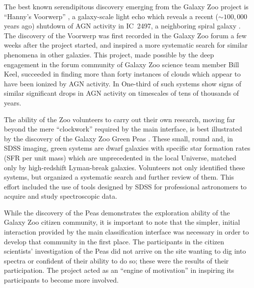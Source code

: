 \documentclass{ar2e}
\def\CaseStudy#1{\noindent{\it\bf #1 \,\,\,\,}}
\begin{document}


\CaseStudy{The Galaxy Zoo Forum.} 

The best known serendipitous discovery emerging from the Galaxy Zoo project is
``Hanny's Voorwerp'' \citep{Lintott++2009}, a galaxy-scale light echo which
reveals a recent ($\sim100,000$ years ago)  shutdown of AGN activity in IC~2497, 
a neighboring spiral galaxy \citep{Keel++2012}. 
The discovery of the Voorwerp was first
recorded in the Galaxy Zoo forum a few weeks after the project started, and
inspired a more systematic search for similar phenomena in other galaxies. This
project, made possible by the deep engagement in the forum community of Galaxy
Zoo science team member Bill Keel, succeeded in finding more than forty
instances of clouds which appear to have been ionized by AGN activity. In
One-third of such systems show signs of similar significant drops in AGN activity on
timescales of tens of thousands of years.  

The ability of the Zoo volunteers to carry out their own research, moving far
beyond the mere ``clockwork'' required by the main interface, is best
illustrated by the discovery of the Galaxy Zoo Green Peas
\citep{Cardamone++2009}. These small, round and, in SDSS imaging, green systems
are dwarf galaxies with specific star formation rates (SFR per unit mass) which
are unprecedented in the local Universe, matched only by high-redshift
Lyman-break galaxies. Volunteers not only identified these systems, but
organized a systematic search and further review of them. This effort included
the use of tools designed by SDSS for professional astronomers to acquire and
study spectroscopic data. 

While the discovery of the Peas demonstrates the exploration ability of the
Galaxy Zoo citizen community, it is important to note that the simpler, initial
interaction provided by the main classification interface was necessary in order
to develop that community in the first place. The participants in the citizen
scientists' investigation of the Peas did not arrive on the site wanting to dig
into spectra or confident of their ability to do so; these were the results of
their participation. The project acted as an ``engine of motivation'' in
inspiring its participants to become more involved. 
\end{document}
